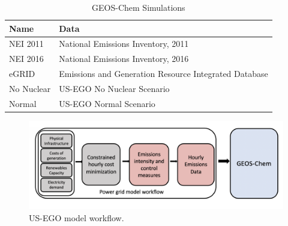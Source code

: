 \documentclass[journal=jacsat,manuscript=article]{achemso}
\begin{document}
\begin{table}
  \caption{GEOS-Chem Simulations}
  \label{tbl:GCruns}
  \begin{tabular}{ll}
    \hline
    Name  & Data  \\
    \hline
    NEI 2011   & National Emissions Inventory, 2011   \\
    NEI 2016 & National Emissions Inventory, 2016  \\
    eGRID  &  Emissions and Generation Resource Integrated Database \\
    No Nuclear & US-EGO No Nuclear Scenario \\
    Normal & US-EGO Normal Scenario \\
    \hline
  \end{tabular}
\end{table}

\begin{figure}[!htb]
    \centering 
    \includegraphics[scale = .5]{US_EGO_flow.png}
    \caption{US-EGO model workflow.}
    \label{fig:model_flow}
\end{figure}
\end{document}
